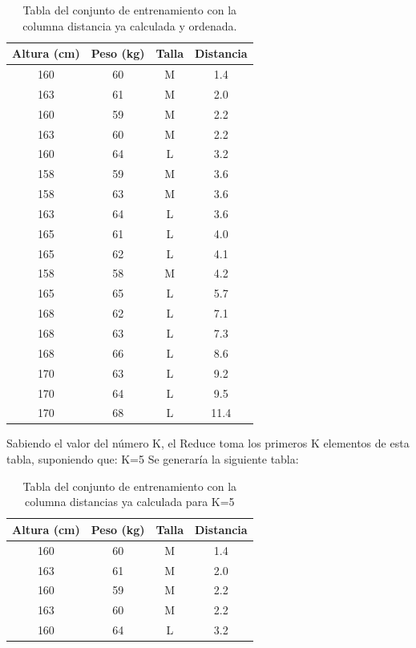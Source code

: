 	\begin{table}[H]
		\begin{center}
			\label{tab:tablaKNNDistancias}
			\begin{tabular}{c|c|c|c}
				\textbf{Altura (cm)} & \textbf{Peso (kg)} & \textbf{Talla} & \textbf{Distancia}\\
				\hline
				160 & 60 & M & 1.4\\
				163 & 61 & M & 2.0\\
				160 & 59 & M & 2.2\\
				163 & 60 & M & 2.2\\
				160 & 64 & L & 3.2\\
				158 & 59 & M & 3.6\\
				158 & 63 & M & 3.6\\
				163 & 64 & L & 3.6\\
				165 & 61 & L & 4.0\\
				165 & 62 & L & 4.1\\
				158 & 58 & M & 4.2\\
				165 & 65 & L & 5.7\\
				168 & 62 & L & 7.1\\
				168 & 63 & L & 7.3\\
				168 & 66 & L & 8.6\\
				170 & 63 & L & 9.2\\
				170 & 64 & L & 9.5\\
				170 & 68 & L & 11.4\\
			\end{tabular}
		\end{center}
		\caption{Tabla del conjunto de entrenamiento con la columna distancia ya calculada y ordenada.}
	\end{table}  
Sabiendo el valor del número K, el Reduce toma los primeros K elementos de esta tabla, suponiendo que:
K=5
Se generaría la siguiente tabla:
	\begin{table}[H]
		\begin{center}
			\label{tab:tablaKNNDistanciask}
			\begin{tabular}{c|c|c|c}
				\textbf{Altura (cm)} & \textbf{Peso (kg)} & \textbf{Talla} & \textbf{Distancia}\\
				\hline
				160 & 60 & M & 1.4\\
				163 & 61 & M & 2.0\\
				160 & 59 & M & 2.2\\
				163 & 60 & M & 2.2\\
				160 & 64 & L & 3.2\\
			\end{tabular}
		\end{center}
		\caption{Tabla del conjunto de entrenamiento con la columna distancias ya calculada para K=5}
	\end{table}
